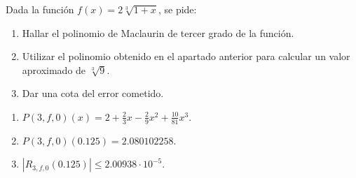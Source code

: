 {Dada  la función $f(x) = 2\sqrt[3]{{1 + x}}$, se pide:
\begin{enumerate}
\item Hallar el polinomio de Maclaurin de tercer grado de la función.
\item Utilizar el polinomio obtenido en el apartado anterior para calcular un valor aproximado de $\sqrt[3]{9}$.
\item Dar una cota del error cometido.
\end{enumerate}
}
{\begin{enumerate}
\item $P(3,f,0)(x)=2+\frac{2}{3}x-\frac{2}{9}x^2+\frac{10}{81}x^3$.
\item $P(3,f,0)(0.125)= 2.080102258$.
\item $|R_{3,f,0}(0.125)| \leq 2.00938\cdot 10^{-5}$.
\end{enumerate}
}

